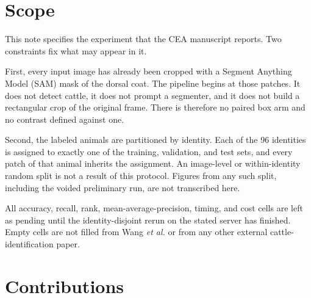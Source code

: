 %
%

\newcommand{\pending}{\textnormal{pending}}

\section{Scope}
\label{sec:scope}

This note specifies the experiment that the CEA manuscript reports. Two constraints fix what may appear in it.

First, every input image has already been cropped with a Segment Anything Model (SAM) mask of the dorsal coat. The pipeline begins at those patches. It does not detect cattle, it does not prompt a segmenter, and it does not build a rectangular crop of the original frame. There is therefore no paired box arm and no contrast defined against one.

Second, the labeled animals are partitioned by identity. Each of the 96 identities is assigned to exactly one of the training, validation, and test sets, and every patch of that animal inherits the assignment. An image-level or within-identity random split is not a result of this protocol. Figures from any such split, including the voided preliminary run, are not transcribed here.

All accuracy, recall, rank, mean-average-precision, timing, and cost cells are left as \pending{} until the identity-disjoint rerun on the stated server has finished. Empty cells are not filled from Wang \emph{et al.} or from any other external cattle-identification paper.

\section{Contributions}
\label{sec:contributions}

